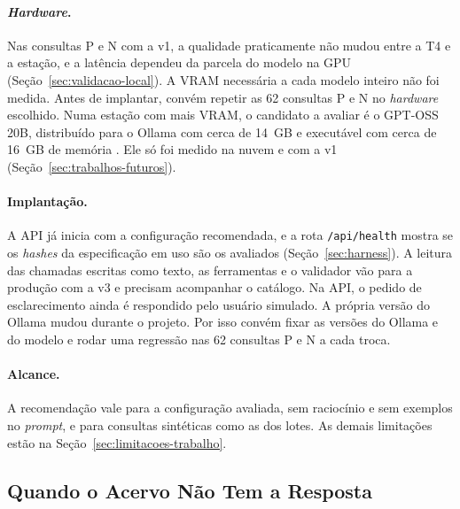 \paragraph{\textit{Hardware}.} Nas consultas P e N com a v1, a qualidade praticamente não mudou entre a T4 e a estação, e a latência dependeu da parcela do modelo na GPU (Seção~\ref{sec:validacao-local}). A VRAM necessária a cada modelo inteiro não foi medida. Antes de implantar, convém repetir as 62 consultas P e N no \textit{hardware} escolhido. Numa estação com mais VRAM, o candidato a avaliar é o GPT-OSS 20B, distribuído para o Ollama com cerca de 14~GB e executável com cerca de 16~GB de memória \cite{ollama2025gptoss}. Ele só foi medido na nuvem e com a v1 (Seção~\ref{sec:trabalhos-futuros}).

\paragraph{Implantação.} A API já inicia com a configuração recomendada, e a rota \texttt{/api/health} mostra se os \textit{hashes} da especificação em uso são os avaliados (Seção~\ref{sec:harness}). A leitura das chamadas escritas como texto, as ferramentas e o validador vão para a produção com a v3 e precisam acompanhar o catálogo. Na API, o pedido de esclarecimento ainda é respondido pelo usuário simulado. A própria versão do Ollama mudou durante o projeto. Por isso convém fixar as versões do Ollama e do modelo e rodar uma regressão nas 62 consultas P e N a cada troca.

\paragraph{Alcance.} A recomendação vale para a configuração avaliada, sem raciocínio e sem exemplos no \textit{prompt}, e para consultas sintéticas como as dos lotes. As demais limitações estão na Seção~\ref{sec:limitacoes-trabalho}.

\subsection{Quando o Acervo Não Tem a Resposta}
\label{sec:sem-carta}

